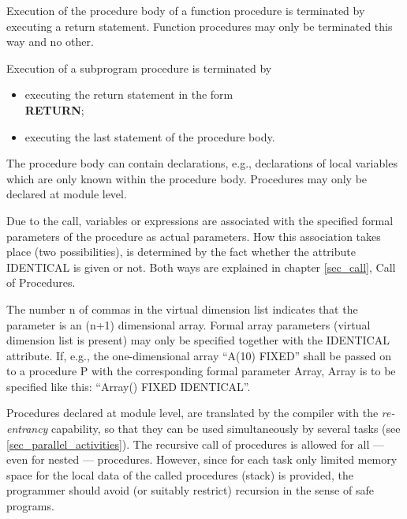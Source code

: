 Execution of the procedure body of a function procedure is terminated by
executing a return statement. Function procedures may only be terminated
this way and no other.

Execution of a subprogram procedure is terminated by
\begin{itemize}
\item executing the return statement in the form\\
      {\bf RETURN};\\
\item executing the last statement of the procedure body.
\end{itemize}

The procedure body can contain declarations, e.g., declarations of local
variables which are only known within the procedure body. 
Procedures may only be declared at module level.

Due to the call, variables or expressions are associated with the
specified formal parameters of the procedure as actual parameters. How
this association takes place (two possibilities), is determined by the
fact whether the attribute IDENTICAL is given or not. Both ways are
explained in chapter \ref{sec_call}, Call of Procedures.

The number n of commas in the virtual dimension list indicates that the
parameter is an (n+1) dimensional array. Formal array parameters
(virtual dimension list is present) may only be specified together with
the IDENTICAL attribute. If, e.g., the one-dimensional array ``A(10)
FIXED'' shall be passed on to a procedure P with the corresponding
formal parameter Array, Array is to be specified like this: ``Array()
FIXED IDENTICAL''.

Procedures declared at module level, are translated by the compiler with
the {\em re-entrancy} capability, so that they can be used
simultaneously by several tasks (see \ref{sec_parallel_activities}). The recursive call of
procedures is allowed for all --- even for nested --- procedures.
However, since for each task only limited memory space for the local
data of the called procedures (stack) is provided, the programmer
should avoid (or suitably restrict) recursion in the sense of safe
programs.

